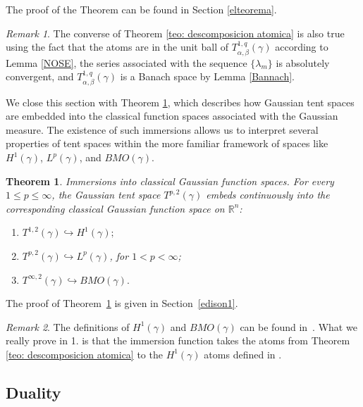 \documentclass[leqno,11pt]{amsart}
\theoremstyle{plain}
\newtheorem{teo}{Theorem}
\theoremstyle{remark}
\newtheorem{remark}{Remark}
\begin{document}
{  The proof of the Theorem can be found in Section \ref{elteorema}.


\begin{remark}
The converse of Theorem \ref{teo: descomposicion atomica} is also true using the fact that the atoms are in the unit ball of $T^{1,q}_{\alpha,\beta}(\gamma)$ according to Lemma \ref{NOSE}, the series associated with the sequence $\{\lambda_m\}$ is absolutely convergent, and $T^{1,q}_{\alpha,\beta}(\gamma)$ is a Banach space by Lemma \ref{Bannach}.
\end{remark}


We close this section with Theorem \ref{coneccion1}, which describes how Gaussian tent spaces are embedded into the classical function spaces associated with the Gaussian measure. The existence of such immersions allows us to interpret several properties of tent spaces within the more familiar framework of spaces like \( H^1(\gamma) \), \( L^p(\gamma) \), and \( BMO(\gamma) \).

 

\begin{teo}\label{coneccion1}
Immersions into classical Gaussian function spaces.
For every \( 1 \le p \le \infty \), the Gaussian tent space \( T^{p,2}(\gamma) \) embeds continuously into the corresponding classical Gaussian function space on \( \mathbb{R}^n \):
\begin{enumerate}
\item \( T^{1,2}(\gamma) \hookrightarrow H^1(\gamma); \)
\item \( T^{p,2}(\gamma) \hookrightarrow L^p(\gamma) \), for \( 1 < p < \infty \);
\item \( T^{\infty,2}(\gamma) \hookrightarrow BMO(\gamma). \)
\end{enumerate}
\end{teo}

The proof of Theorem~\ref{coneccion1} is given in Section~\ref{edison1}.




\begin{remark}
The definitions of \( H^1(\gamma) \) and \( BMO(\gamma) \) can be found in~\cite{MM}. 
What we really prove in 1. is that the immersion function takes the atoms from
Theorem \ref{teo: descomposicion atomica} to the $H^1(\gamma)$ atoms defined in \cite{MM}.
\end{remark}
 



\subsection{Duality}\label{carleson}

}
\end{document}
